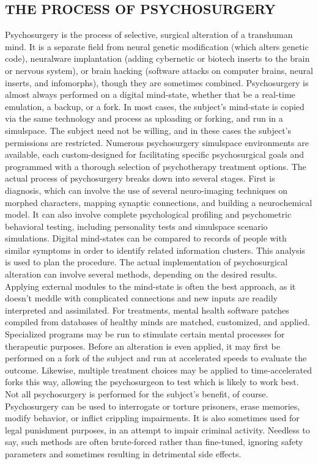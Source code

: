 \subsection{THE PROCESS OF PSYCHOSURGERY} Psychosurgery is the process of selective, surgical alteration of a transhuman mind. It is a separate field from neural genetic modification (which alters genetic code), neuralware implantation (adding cybernetic or biotech inserts to the brain or nervous system), or brain hacking (software attacks on computer brains, neural inserts, and infomorphs), though they are sometimes combined. Psychosurgery is almost always performed on a digital mind-state, whether that be a real-time emulation, a backup, or a fork. In most cases, the subject’s mind-state is copied via the same technology and process as uploading or forking, and run in a simulspace. The subject need not be willing, and in these cases the subject’s permissions are restricted. Numerous psychosurgery simulspace environments are available, each custom-designed for facilitating specific psychosurgical goals and programmed with a thorough selection of psychotherapy treatment options. The actual process of psychosurgery breaks down into several stages. First is diagnosis, which can involve the use of several neuro-imaging techniques on morphed characters, mapping synaptic connections, and building a neurochemical model. It can also involve complete psychological profiling and psychometric behavioral testing, including personality tests and simulspace scenario simulations. Digital mind-states can be compared to records of people with similar symptoms in order to identify related information clusters. This analysis is used to plan the procedure. The actual implementation of psychosurgical alteration can involve several methods, depending on the desired results. Applying external modules to the mind-state is often the best approach, as it doesn’t meddle with complicated connections and new inputs are readily interpreted and assimilated. For treatments, mental health software patches compiled from databases of healthy minds are matched, customized, and applied. Specialized programs may be run to stimulate certain mental processes for therapeutic purposes. Before an alteration is even applied, it may first be performed on a fork of the subject and run at accelerated speeds to evaluate the outcome. Likewise, multiple treatment choices may be applied to time-accelerated forks this way, allowing the psychosurgeon to test which is likely to work best. Not all psychosurgery is performed for the subject’s benefit, of course. Psychosurgery can be used to interrogate or torture prisoners, erase memories, modify behavior, or inflict crippling impairments. It is also sometimes used for legal punishment purposes, in an attempt to impair criminal activity. Needless to say, such methods are often brute-forced rather than fine-tuned, ignoring safety parameters and sometimes resulting in detrimental side effects. 




